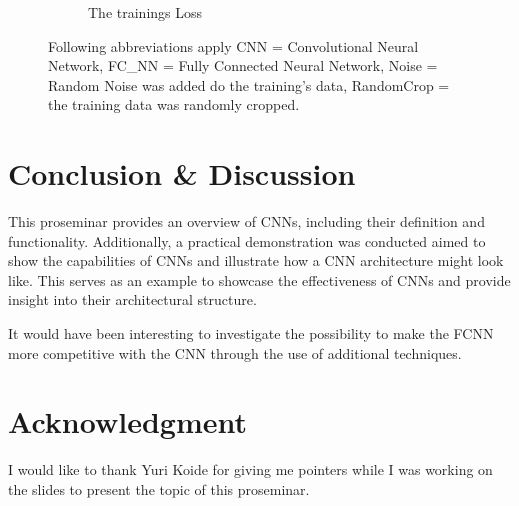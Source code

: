 \begin{figure}[h]
\begin{subfigure}[b]{0.5\textwidth}
        \caption{The trainings Loss}
    \end{subfigure}
    \caption{Following abbreviations apply CNN = Convolutional Neural Network, FC\_NN = Fully Connected Neural Network, Noise = Random Noise was added do the training's data, RandomCrop = the training data was randomly cropped.}
    \label{fig:results}
\end{figure}

\section{Conclusion \& Discussion}

This proseminar provides an overview of CNNs, including their definition and functionality.
Additionally, a practical demonstration was conducted aimed to show the capabilities of CNNs and illustrate how a CNN architecture might look like.
This serves as an example to showcase the effectiveness of CNNs and provide insight into their architectural structure.

It would have been interesting to investigate the possibility to make the FCNN more competitive with the CNN through the use of additional techniques.

\section{Acknowledgment}

I would like to thank Yuri Koide for giving me pointers while I was working on the slides to present the topic of this proseminar.

